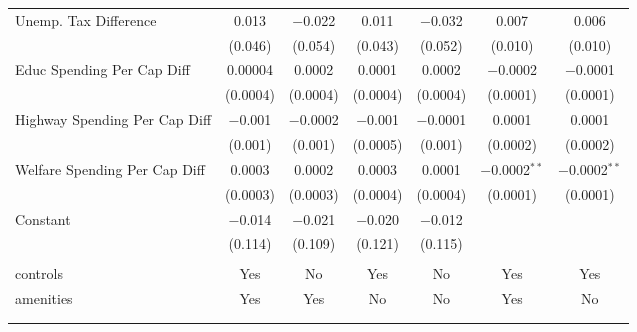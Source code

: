 \begin{table}[!htbp]
\begin{tabular}{@{\extracolsep{5pt}}lcccccc}
  Unemp. Tax Difference & 0.013 & $-$0.022 & 0.011 & $-$0.032 & 0.007 & 0.006 \\ 
  & (0.046) & (0.054) & (0.043) & (0.052) & (0.010) & (0.010) \\ 
  Educ Spending Per Cap Diff & 0.00004 & 0.0002 & 0.0001 & 0.0002 & $-$0.0002 & $-$0.0001 \\ 
  & (0.0004) & (0.0004) & (0.0004) & (0.0004) & (0.0001) & (0.0001) \\ 
  Highway Spending Per Cap Diff & $-$0.001 & $-$0.0002 & $-$0.001 & $-$0.0001 & 0.0001 & 0.0001 \\ 
  & (0.001) & (0.001) & (0.0005) & (0.001) & (0.0002) & (0.0002) \\ 
  Welfare Spending Per Cap Diff & 0.0003 & 0.0002 & 0.0003 & 0.0001 & $-$0.0002$^{**}$ & $-$0.0002$^{**}$ \\ 
  & (0.0003) & (0.0003) & (0.0004) & (0.0004) & (0.0001) & (0.0001) \\ 
  Constant & $-$0.014 & $-$0.021 & $-$0.020 & $-$0.012 &  &  \\ 
  & (0.114) & (0.109) & (0.121) & (0.115) &  &  \\ 
 \hline \\[-1.8ex] 
controls & Yes & No & Yes & No & Yes & Yes \\ 
amenities & Yes & Yes & No & No & Yes & No \\ 
\hline \\[-1.8ex] 
\hline 
\hline \\[-1.8ex] 
\end{tabular} 
\end{table} 
